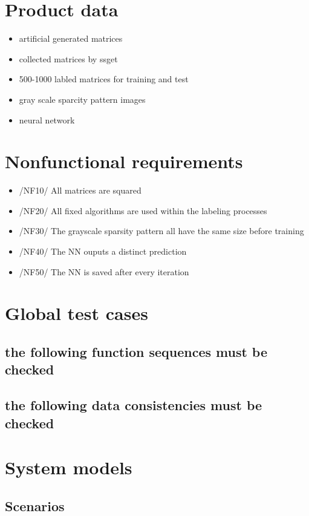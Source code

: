 \documentclass[parskip=full]{scrartcl}
\begin{document}
\section{Product data}
	\begin{itemize}
	\item artificial generated matrices
	\item collected matrices by ssget
	\item 500-1000 labled matrices for training and test
	\item gray scale sparcity pattern images
	\item \gls{neural network}

	\end{itemize}

\section{Nonfunctional requirements}
	\begin{itemize}
		\item /NF10/ All matrices are squared
		\item /NF20/ All fixed algorithms are used within the labeling processes
		\item /NF30/ The grayscale sparsity pattern all have the same size before training
		\item /NF40/ The NN ouputs a distinct prediction
		\item /NF50/ The NN is saved after every iteration
	\end{itemize}
	

\section{Global test cases}
\subsection{the following function sequences must be checked}
\subsection{the following data consistencies must be checked}
\newpage
\section{System models}
\subsection{Scenarios}
\end{document}
